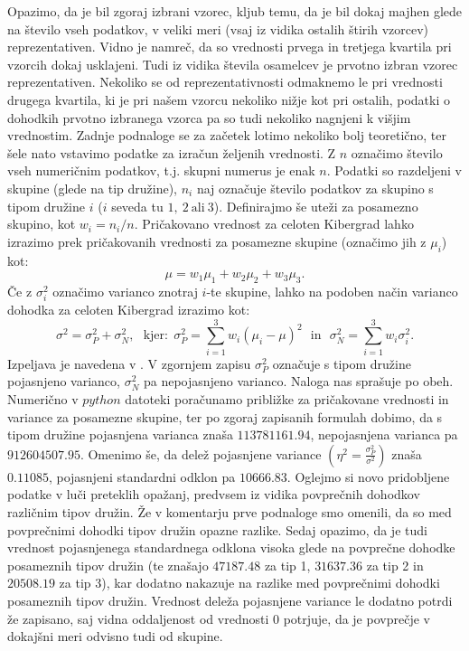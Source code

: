 \documentclass{article}
\begin{document}
Opazimo, da je bil zgoraj izbrani vzorec, kljub temu, da je bil dokaj majhen glede na število vseh podatkov, v veliki meri (vsaj iz vidika ostalih štirih vzorcev) reprezentativen.
Vidno je namreč, da so vrednosti prvega in tretjega kvartila pri vzorcih dokaj usklajeni. 
Tudi iz vidika števila osamelcev je prvotno izbran vzorec reprezentativen. 
Nekoliko se od reprezentativnosti odmaknemo le pri vrednosti drugega kvartila, ki je pri našem vzorcu nekoliko nižje kot pri ostalih, podatki o dohodkih prvotno izbranega vzorca pa so tudi nekoliko nagnjeni k višjim vrednostim.
\newline
\newline
Zadnje podnaloge se za začetek lotimo nekoliko bolj teoretično, ter šele nato vstavimo podatke za izračun željenih vrednosti. 
Z $n$ označimo število vseh numeričnim podatkov, t.j. skupni numerus je enak $n$. Podatki so razdeljeni v skupine (glede na tip družine), $n_i$ naj označuje število podatkov za skupino s tipom družine $i$ ($i$ seveda tu $1,~2~\text{ali}~3$).
Definirajmo še uteži za posamezno skupino, kot $w_i = n_i/n$.
\newline
Pričakovano vrednost za celoten Kibergrad lahko izrazimo prek pričakovanih vrednosti za posamezne skupine (označimo jih z $\mu_i$) kot:
$$
    \mu = w_1 \mu_1 + w_2 \mu_2 + w_3 \mu_3.
$$
Če z $\sigma_{i}^2$ označimo varianco znotraj $i$-te skupine, lahko na podoben način varianco dohodka za celoten Kibergrad izrazimo kot:
$$
\sigma^2 = \sigma_{P}^2 + \sigma_{N}^2,~~~\text{kjer:}~~\sigma_{P}^2 = \sum_{i=1}^{3}{w_i(\mu_i - \mu)^2}~~~\text{in}~~~\sigma_{N}^2 = \sum_{i=1}^{3}{w_i \sigma_{i}^2}.
$$
Izpeljava je navedena v \cite{poj_nepo_var}. V zgornjem zapisu $\sigma_P^2$ označuje s tipom družine pojasnjeno varianco, $\sigma_N^2$ pa nepojasnjeno varianco. Naloga nas sprašuje po obeh. 
\newline
Numerično v $python$ datoteki poračunamo približke za pričakovane vrednosti in variance za posamezne skupine, ter po zgoraj zapisanih formulah dobimo, 
da s tipom družine pojasnjena varianca znaša $113781161.94$, nepojasnjena varianca pa $912604507.95$. Omenimo še, da delež pojasnjene variance $\left(\eta^2 = \frac{\sigma_{P}^2}{\sigma^2}\right)$ znaša $0.11085$, pojasnjeni standardni odklon pa $10666.83$.
\newline
\newline
Oglejmo si novo pridobljene podatke v luči preteklih opažanj, predvsem iz vidika povprečnih dohodkov različnim tipov družin. Že v komentarju prve podnaloge smo omenili, da so med povprečnimi dohodki tipov družin opazne razlike.  
Sedaj opazimo, da je tudi vrednost pojasnjenega standardnega odklona visoka glede na povprečne dohodke posameznih tipov družin (te znašajo $47187.48$ za tip 1, $31637.36$ za tip 2 in $20508.19$ za tip 3), kar dodatno nakazuje na razlike med povprečnimi dohodki posameznih tipov družin.
Vrednost deleža pojasnjene variance le dodatno potrdi že zapisano, saj vidna oddaljenost od vrednosti $0$ potrjuje, da je povprečje v dokajšni meri odvisno tudi od skupine.
\end{document}

